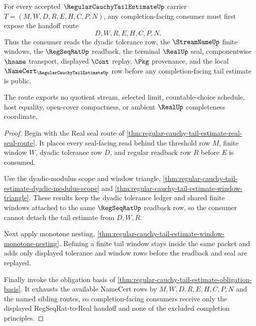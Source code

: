 \begin{theorem}
\label{thm:regular-cauchy-tail-estimate-regseqrat-handoff}
For every accepted $\RegularCauchyTailEstimateUp$ carrier
$T=(M,W,D,R,E,H,C,P,N)$, any completion-facing consumer must first expose the
handoff route
$$
D,W,R,E,H,C,P,N .
$$
Thus the consumer reads the dyadic tolerance row, the $\StreamNameUp$ finite
windows, the $\RegSeqRatUp$ readback, the terminal $\RealUp$ seal,
componentwise $\hsame$ transport, displayed $\Cont$ replay, $\Pkg$ provenance,
and the local $\NameCert_{\RegularCauchyTailEstimateUp}$ row before any
completion-facing tail estimate is public.

The route exports no quotient stream, selected limit, countable-choice
schedule, host equality, open-cover compactness, or ambient $\RealUp$
completeness coordinate.
\end{theorem}
\begin{proof}
Begin with the Real seal route of
\autoref{thm:regular-cauchy-tail-estimate-real-seal-route}. It places every
seal-facing read behind the threshold row $M$, finite window $W$, dyadic
tolerance row $D$, and regular readback row $R$ before $E$ is consumed.

Use the dyadic-modulus scope and window triangle,
\autoref{thm:regular-cauchy-tail-estimate-dyadic-modulus-scope} and
\autoref{thm:regular-cauchy-tail-estimate-window-triangle}. These results keep
the dyadic tolerance ledger and shared finite windows attached to the same
$\RegSeqRatUp$ readback row, so the consumer cannot detach the tail estimate
from $D,W,R$.

Next apply monotone nesting,
\autoref{thm:regular-cauchy-tail-estimate-window-monotone-nesting}. Refining a
finite tail window stays inside the same packet and adds only displayed
tolerance and window rows before the readback and seal are replayed.

Finally invoke the obligation basis of
\autoref{thm:regular-cauchy-tail-estimate-obligation-basis}. It exhausts the
available NameCert rows by $M,W,D,R,E,H,C,P,N$ and the named sibling routes, so
completion-facing consumers receive only the displayed RegSeqRat-to-Real
handoff and none of the excluded completion principles.
\end{proof}

